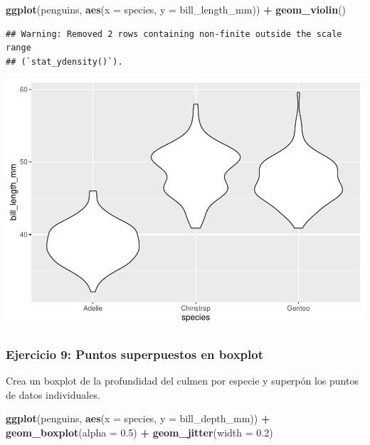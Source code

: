 \documentclass[
]{book}
\newenvironment{Shaded}{\begin{snugshade}}{\end{snugshade}}
\newcommand{\AttributeTok}[1]{\textcolor[rgb]{0.13,0.29,0.53}{#1}}
\newcommand{\FloatTok}[1]{\textcolor[rgb]{0.00,0.00,0.81}{#1}}
\newcommand{\FunctionTok}[1]{\textcolor[rgb]{0.13,0.29,0.53}{\textbf{#1}}}
\newcommand{\NormalTok}[1]{#1}
\newcommand{\SpecialCharTok}[1]{\textcolor[rgb]{0.81,0.36,0.00}{\textbf{#1}}}
\begin{document}
\begin{Shaded}
\begin{Highlighting}[]
\FunctionTok{ggplot}\NormalTok{(penguins, }\FunctionTok{aes}\NormalTok{(}\AttributeTok{x =}\NormalTok{ species, }\AttributeTok{y =}\NormalTok{ bill\_length\_mm)) }\SpecialCharTok{+}
  \FunctionTok{geom\_violin}\NormalTok{()}
\end{Highlighting}
\end{Shaded}

\begin{verbatim}
## Warning: Removed 2 rows containing non-finite outside the scale range
## (`stat_ydensity()`).
\end{verbatim}

\includegraphics{bookdown-demo_files/figure-latex/unnamed-chunk-188-1.pdf}

\subsubsection{Ejercicio 9: Puntos superpuestos en boxplot}\label{ejercicio-9-puntos-superpuestos-en-boxplot}

Crea un boxplot de la profundidad del culmen por especie y superpón los puntos de datos individuales.

\begin{Shaded}
\begin{Highlighting}[]
\FunctionTok{ggplot}\NormalTok{(penguins, }\FunctionTok{aes}\NormalTok{(}\AttributeTok{x =}\NormalTok{ species, }\AttributeTok{y =}\NormalTok{ bill\_depth\_mm)) }\SpecialCharTok{+}
  \FunctionTok{geom\_boxplot}\NormalTok{(}\AttributeTok{alpha =} \FloatTok{0.5}\NormalTok{) }\SpecialCharTok{+}
  \FunctionTok{geom\_jitter}\NormalTok{(}\AttributeTok{width =} \FloatTok{0.2}\NormalTok{)}
\end{Highlighting}
\end{Shaded}
\end{document}
